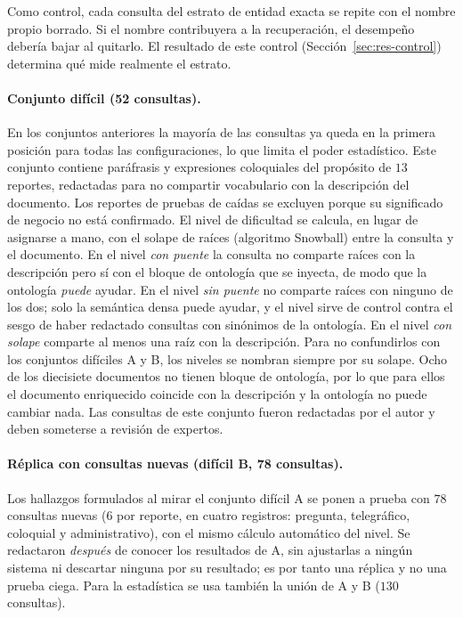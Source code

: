 \documentclass[11pt,letterpaper]{article}
\numberwithin{equation}{section}
\begin{document}
Como control, cada consulta del estrato de entidad exacta se repite con el nombre propio borrado. Si el nombre contribuyera a la recuperación, el desempeño debería bajar al quitarlo. El resultado de este control (Sección~\ref{sec:res-control}) determina qué mide realmente el estrato.

\paragraph{Conjunto difícil (52 consultas).} En los conjuntos anteriores la mayoría de las consultas ya queda en la primera posición para todas las configuraciones, lo que limita el poder estadístico. Este conjunto contiene paráfrasis y expresiones coloquiales del propósito de $13$ reportes, redactadas para no compartir vocabulario con la descripción del documento. Los reportes de pruebas de caídas se excluyen porque su significado de negocio no está confirmado. El nivel de dificultad se calcula, en lugar de asignarse a mano, con el solape de raíces (algoritmo Snowball) entre la consulta y el documento. En el nivel \emph{con puente} la consulta no comparte raíces con la descripción pero sí con el bloque de ontología que se inyecta, de modo que la ontología \emph{puede} ayudar. En el nivel \emph{sin puente} no comparte raíces con ninguno de los dos; solo la semántica densa puede ayudar, y el nivel sirve de control contra el sesgo de haber redactado consultas con sinónimos de la ontología. En el nivel \emph{con solape} comparte al menos una raíz con la descripción. Para no confundirlos con los conjuntos difíciles A y B, los niveles se nombran siempre por su solape. Ocho de los diecisiete documentos no tienen bloque de ontología, por lo que para ellos el documento enriquecido coincide con la descripción y la ontología no puede cambiar nada. Las consultas de este conjunto fueron redactadas por el autor y deben someterse a revisión de expertos.

\paragraph{Réplica con consultas nuevas (difícil B, 78 consultas).} Los hallazgos formulados al mirar el conjunto difícil A se ponen a prueba con $78$ consultas nuevas ($6$ por reporte, en cuatro registros: pregunta, telegráfico, coloquial y administrativo), con el mismo cálculo automático del nivel. Se redactaron \emph{después} de conocer los resultados de A, sin ajustarlas a ningún sistema ni descartar ninguna por su resultado; es por tanto una réplica y no una prueba ciega. Para la estadística se usa también la unión de A y B ($130$ consultas).
\end{document}
